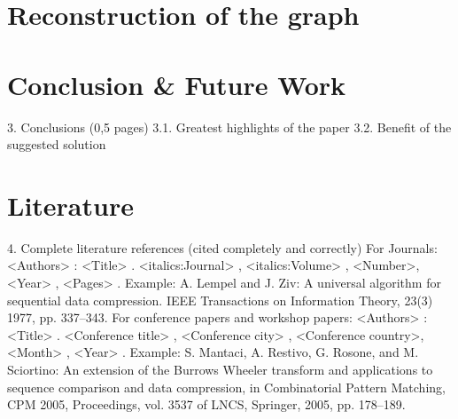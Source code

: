 \documentclass[a4paper]{scrartcl}
\begin{document}
\section{Reconstruction of the graph}


\section{Conclusion \& Future Work}
3. Conclusions (0,5 pages)
3.1. Greatest highlights of the paper
3.2. Benefit of the suggested solution



\section{Literature}

4. Complete literature references (cited completely and correctly)
For Journals:
<Authors> : <Title> . <italics:Journal> , <italics:Volume> , <Number>, <Year> , <Pages> .
Example:
A. Lempel and J. Ziv: A universal algorithm for sequential data compression. IEEE Transactions
on Information Theory, 23(3) 1977, pp. 337–343.
For conference papers and workshop papers:
<Authors> : <Title> . <Conference title> , <Conference city> , <Conference country>, <Month> ,
<Year> .
Example:
S. Mantaci, A. Restivo, G. Rosone, and M. Sciortino: An extension of the Burrows Wheeler
transform and applications to sequence comparison and data compression, in Combinatorial
Pattern Matching, CPM 2005, Proceedings, vol. 3537 of LNCS, Springer, 2005, pp. 178–189.



\pagebreak

\nocite{*}
\printbibliography
\end{document}
